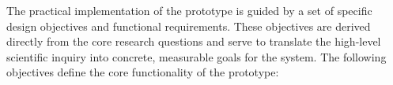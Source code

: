 

The practical implementation of the prototype is guided by a set of specific design objectives and functional requirements. These objectives are derived directly from the core research questions and serve to translate the high-level scientific inquiry into concrete, measurable goals for the system. The following objectives define the core functionality of the prototype:

